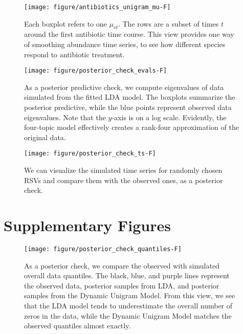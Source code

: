 \documentclass[oupdraft]{bio}
\begin{document}
\begin{figure}[!p]
  \centering
  \texttt{[image: figure/antibiotics\_unigram\_mu-F]}
  \caption{Each boxplot refers to one $\mu_{vt}$. The rows are a subset of times
    $t$ around the first antibiotic time course. This view provides one way of
    smoothing abundance time series, to see how different species respond to
    antibiotic treatment. \label{fig:antibiotics_unigram_theta} }
\end{figure}

\begin{figure}[!p]
  \centering
  \texttt{[image: figure/posterior\_check\_evals-F]}
  \caption{As a posterior predictive check, we compute eigenvalues of data
    simulated from the fitted LDA model. The boxplots summarize the posterior
    predictive, while the blue points represent observed data eigenvalues. Note
    that the $y$-axis is on a log scale. Evidently, the four-topic model
    effectively creates a rank-four approximation of the original
    data. \label{fig:antibiotics_posterior_evals}}
\end{figure}

\begin{figure}[!p]
  \centering
  \texttt{[image: figure/posterior\_check\_ts-F]}
  \caption{We can visualize the simulated time series for randomly chosen RSVs
    and compare them with the observed ones, as a posterior check.
    \label{fig:antibiotics_posterior_ts}}
\end{figure}


\section{Supplementary Figures}

\begin{figure}[!p]
  \centering
  \texttt{[image: figure/posterior\_check\_quantiles-F]}
  \caption{As a posterior check, we compare the observed with simulated overall
    data quantiles. The black, blue, and purple lines represent the observed
    data, posterior samples from LDA, and posterior samples from the Dynamic
    Unigram Model. From this view, we see that the LDA model tends to
    underestimate the overall number of zeros in the data, while the Dynamic
    Unigram Model matches the observed quantiles almost
    exactly. \label{fig:antibiotics_posterior_quantiles} }
\end{figure}
\end{document}
